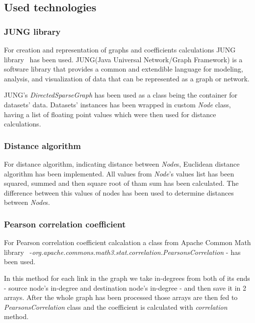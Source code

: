 \subsection{Used technologies}
\subsubsection{JUNG library}
For creation and representation of graphs and coefficients calculations JUNG library~\cite{jung} has been used.
JUNG(Java Universal Network/Graph Framework) is a software library that provides a common and extendible language for modeling, analysis, and visualization of data that can be represented as a graph or network.

JUNG's \emph{DirectedSparseGraph} has been used as a class being the container for datasets' data.
Datasets' instances has been wrapped in custom \emph{Node} class, having a list of floating point values which were then used for distance calculations.


\subsubsection{Distance algorithm}
For distance algorithm, indicating distance between \emph{Node}s, Euclidean distance algorithm has been implemented.
All values from \emph{Node}'s values list has been squared, summed and then square root of tham sum has been calculated.
The difference between this values of nodes has been used to determine distances between \emph{Node}s.


\subsubsection{Pearson correlation coefficient}
For Pearson correlation coefficient calcalation a class from Apache Common Math library~\cite{apache_common_math} -\emph{org.apache.commons.math3.stat.correlation.PearsonsCorrelation} - has been used.

In this method for each link in the graph we take in-degrees from both of its ends - source node's in-degree and  destination node's in-degree - and then save it in 2 arrays.
After the whole graph has been processed those arrays are then fed to \emph{PearsonsCorrelation} class and the coefficient is calculated with \emph{correlation} method.

\begin{filecode}[label=lst:pearsonCorrelation,caption=Method used for Pearson correlation coefficient calculation.]
  
\end{filecode}

